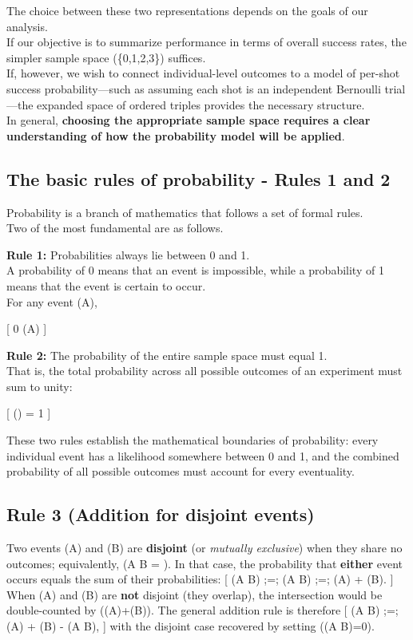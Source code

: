 \documentclass[
  letterpaper,
  DIV=11,
  numbers=noendperiod]{scrreprt}
\begin{document}
The choice between these two representations depends on the goals of our
analysis.\\
If our objective is to summarize performance in terms of overall success
rates, the simpler sample space (\{0,1,2,3\}) suffices.\\
If, however, we wish to connect individual-level outcomes to a model of
per-shot success probability---such as assuming each shot is an
independent Bernoulli trial---the expanded space of ordered triples
provides the necessary structure.\\
In general, \textbf{choosing the appropriate sample space requires a
clear understanding of how the probability model will be applied}.

\subsection{The basic rules of probability - Rules 1 and
2}\label{the-basic-rules-of-probability---rules-1-and-2}

Probability is a branch of mathematics that follows a set of formal
rules.\\
Two of the most fundamental are as follows.

\textbf{Rule 1:} Probabilities always lie between 0 and 1.\\
A probability of 0 means that an event is impossible, while a
probability of 1 means that the event is certain to occur.\\
For any event (A),

{[} 0 \leq \Pr(A)  {]}

\textbf{Rule 2:} The probability of the entire sample space must equal
1.\\
That is, the total probability across all possible outcomes of an
experiment must sum to unity:

{[} \Pr() = 1 {]}

These two rules establish the mathematical boundaries of probability:
every individual event has a likelihood somewhere between 0 and 1, and
the combined probability of all possible outcomes must account for every
eventuality.

\subsection{Rule 3 (Addition for disjoint
events)}\label{rule-3-addition-for-disjoint-events}

Two events (A) and (B) are \textbf{disjoint} (or \emph{mutually
exclusive}) when they share no outcomes; equivalently, (A \cap B =
\varnothing). In that case, the probability that \textbf{either} event
occurs equals the sum of their probabilities: {[} \Pr(A  B)
;=; \Pr(A \cup B) ;=; \Pr(A) + \Pr(B). {]} When (A) and (B) are
\textbf{not} disjoint (they overlap), the intersection would be
double-counted by (\Pr(A)+\Pr(B)). The general addition rule is
therefore {[} \Pr(A \cup B) ;=; \Pr(A) + \Pr(B) - \Pr(A \cap B), {]}
with the disjoint case recovered by setting (\Pr(A \cap B)=0).
\end{document}
